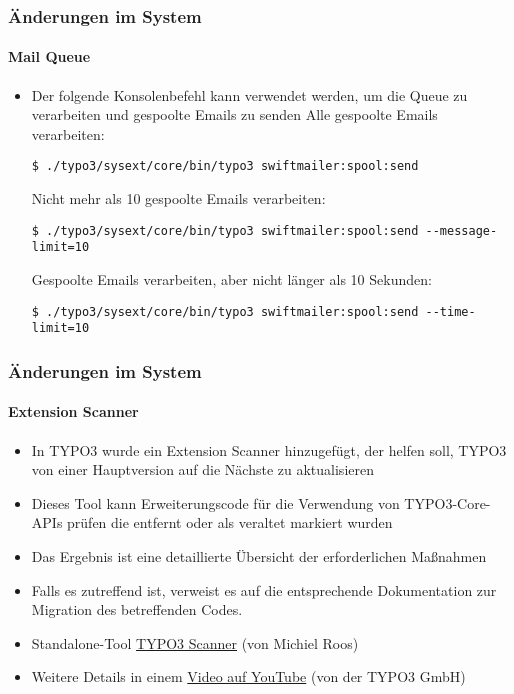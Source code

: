 \begin{frame}[fragile]
	\frametitle{Änderungen im System}
	\framesubtitle{Mail Queue}

	\lstset{basicstyle=\tiny\ttfamily}

	\begin{itemize}
		\item Der folgende Konsolenbefehl kann verwendet werden, um die Queue zu verarbeiten und
			gespoolte Emails zu senden
			\newline\newline
			\small
				Alle gespoolte Emails verarbeiten:
			\normalsize
\begin{lstlisting}
$ ./typo3/sysext/core/bin/typo3 swiftmailer:spool:send
\end{lstlisting}

			\small
				Nicht mehr als 10 gespoolte Emails verarbeiten:
			\normalsize
\begin{lstlisting}
$ ./typo3/sysext/core/bin/typo3 swiftmailer:spool:send --message-limit=10
\end{lstlisting}

			\small
				Gespoolte Emails verarbeiten, aber nicht länger als 10 Sekunden:
			\normalsize
\begin{lstlisting}
$ ./typo3/sysext/core/bin/typo3 swiftmailer:spool:send --time-limit=10
\end{lstlisting}

	\end{itemize}

\end{frame}


\begin{frame}[fragile]
	\frametitle{Änderungen im System}
	\framesubtitle{Extension Scanner}

	\begin{itemize}
		\item In TYPO3 wurde ein Extension Scanner hinzugefügt, der helfen soll, TYPO3
			von einer Hauptversion auf die Nächste zu aktualisieren
		\item Dieses Tool kann Erweiterungscode für die Verwendung von TYPO3-Core-APIs prüfen
			die entfernt oder als veraltet markiert wurden
		\item Das Ergebnis ist eine detaillierte Übersicht der erforderlichen Maßnahmen
		\item Falls es zutreffend ist, verweist es auf die entsprechende Dokumentation 
			zur Migration des betreffenden Codes.
		\item Standalone-Tool \href{https://github.com/Tuurlijk/typo3scan}{TYPO3 Scanner}
			(von Michiel Roos)
		\item Weitere Details in einem \href{https://www.youtube.com/watch?v=UdIYDZgBrQU}{Video auf YouTube}
			(von der TYPO3 GmbH)
	\end{itemize}

\end{frame}

